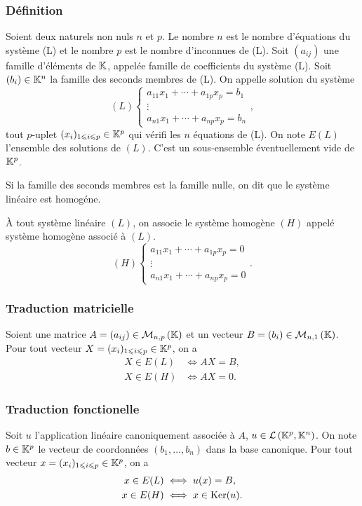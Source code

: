 \subsubsection{Définition}
\begin{defdef}
  Soient deux naturels non nuls \(n\) et \(p\). Le nombre \(n\) est le nombre d'équations du système (L) et le nombre \(p\) est le nombre d'inconnues de (L). Soit \((a_{ij})\) une famille d'éléments de \(\mathbb{K}\), appelée famille de coefficients du système (L). Soit \((b_i) \in \mathbb{K}^n\) la famille des seconds membres de (L). On appelle solution du système
  \begin{equation}
    (L)
    \begin{cases}
      a_{11}x_1 + \dotsb +a_{1p}x_p = b_1 \\
      \vdots \\
      a_{n1}x_1 + \dotsb +a_{np}x_p = b_n
    \end{cases},
  \end{equation}
  tout \(p\)-uplet \((x_i)_{1\leqslant i\leqslant p} \in \mathbb{K}^p\) qui vérifi les \(n\) équations de (L). On note \(E(L)\) l'ensemble des solutions de \((L)\). C'est un sous-ensemble éventuellement vide de \(\mathbb{K}^p\).
\end{defdef}
%
\begin{defdef}
  Si la famille des seconds membres est la famille nulle, on dit que le système linéaire est homogéne.
\end{defdef}
%
À tout système linéaire \((L)\), on associe le système homogène \((H)\) appelé système homogène associé à \((L)\).
\begin{equation}
  (H)
  \begin{cases}
    a_{11}x_1 + \dotsb +a_{1p}x_p = 0 \\
    \vdots \\
    a_{n1}x_1 + \dotsb +a_{np}x_p = 0
  \end{cases}.
\end{equation}
%
\subsubsection{Traduction matricielle}
Soient une matrice \(A=(a_{ij}) \in \mathcal{M}_{n,p}\left(\mathbb{K}\right)\) et un vecteur \(B=(b_{i}) \in \mathcal{M}_{n,1}\left(\mathbb{K}\right)\). Pour tout vecteur \(X=(x_i)_{1\leqslant i \leqslant p} \in \mathbb{K}^p\), on a
\begin{align}
  X \in E(L) &\iff AX=B, \\
  X \in E(H) &\iff AX=0.
\end{align}
%
\subsubsection{Traduction fonctionelle}
Soit \(u\) l'application linéaire canoniquement associée à \(A\), \(u \in \mathcal{L}\left(\mathbb{K}^p,\mathbb{K}^n\right)\). On note \(b \in \mathbb{K}^p\) le vecteur de coordonnées \((b_1, \ldots, b_n)\) dans la base canonique. Pour tout vecteur \(x=(x_i)_{1\leqslant i \leqslant p} \in \mathbb{K}^p\), on a
\begin{align}
  x \in E(L) &\iff u(x)=B, \\
  x \in E(H) &\iff x\in\operatorname{Ker}(u).
\end{align}

